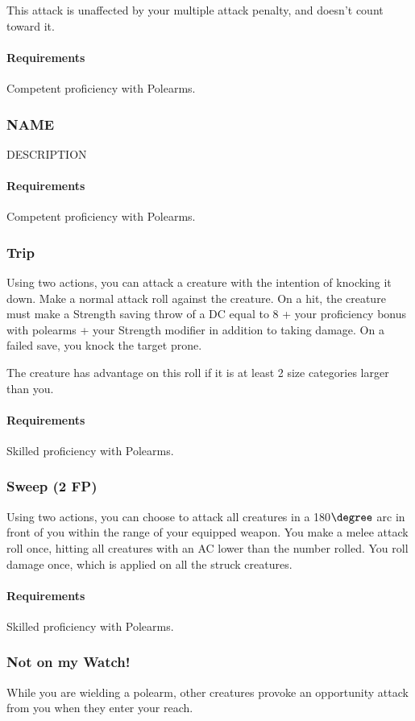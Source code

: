     This attack is unaffected by your multiple attack penalty, and doesn't count toward it.
    \paragraph{Requirements} Competent proficiency with Polearms.
\subsubsection{NAME} \label{feat::name}
    DESCRIPTION
    \paragraph{Requirements} Competent proficiency with Polearms.
\subsubsection{Trip} \label{feat::trip}
    Using two actions, you can attack a creature with the intention of knocking it down.
    Make a normal attack roll against the creature.
    On a hit, the creature must make a Strength saving throw of a DC equal to 8 + your proficiency bonus with polearms + your Strength modifier in addition to taking damage.
    On a failed save, you knock the target prone.

    The creature has advantage on this roll if it is at least 2 size categories larger than you.
    \paragraph{Requirements} Skilled proficiency with Polearms.
\subsubsection{Sweep (2 FP)} \label{feat::sweep}
    Using two actions, you can choose to attack all creatures in a 180$\degree$ arc in front of you within the range of your equipped weapon.
    You make a melee attack roll once, hitting all creatures with an AC lower than the number rolled.
    You roll damage once, which is applied on all the struck creatures.
    \paragraph{Requirements} Skilled proficiency with Polearms.
\subsubsection{Not on my Watch!} \label{feat::notonmywatch}
    While you are wielding a polearm, other creatures provoke an opportunity attack from you when they enter your reach.
